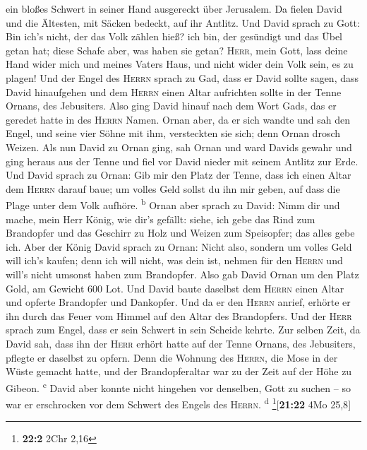 ein bloßes Schwert in seiner Hand ausgereckt über Jerusalem. Da fielen
David und die Ältesten, mit Säcken bedeckt, auf ihr Antlitz.
 Und David sprach zu Gott: Bin ich's nicht, der das Volk
zählen hieß? ich bin, der gesündigt und das Übel getan hat; diese Schafe
aber, was haben sie getan? \textsc{Herr}, mein Gott, lass deine Hand
wider mich und meines Vaters Haus, und nicht wider dein Volk sein, es zu
plagen!  Und der Engel des \textsc{Herrn} sprach zu Gad,
dass er David sollte sagen, dass David hinaufgehen und dem
\textsc{Herrn} einen Altar aufrichten sollte in der Tenne Ornans, des
Jebusiters.  Also ging David hinauf nach dem Wort Gads,
das er geredet hatte in des \textsc{Herrn} Namen.  Ornan
aber, da er sich wandte und sah den Engel, und seine vier Söhne mit ihm,
versteckten sie sich; denn Ornan drosch Weizen.  Als nun
David zu Ornan ging, sah Ornan und ward Davids gewahr und ging heraus
aus der Tenne und fiel vor David nieder mit seinem Antlitz zur Erde.
 Und David sprach zu Ornan: Gib mir den Platz der Tenne,
dass ich einen Altar dem \textsc{Herrn} darauf baue; um volles Geld
sollst du ihn mir geben, auf dass die Plage unter dem Volk aufhöre.
\textsuperscript{b}  Ornan aber sprach zu David: Nimm dir
und mache, mein Herr König, wie dir's gefällt: siehe, ich gebe das Rind
zum Brandopfer und das Geschirr zu Holz und Weizen zum Speisopfer; das
alles gebe ich.  Aber der König David sprach zu Ornan:
Nicht also, sondern um volles Geld will ich's kaufen; denn ich will
nicht, was dein ist, nehmen für den \textsc{Herrn} und will's nicht
umsonst haben zum Brandopfer.  Also gab David Ornan um
den Platz Gold, am Gewicht 600 Lot.  Und David baute
daselbst dem \textsc{Herrn} einen Altar und opferte Brandopfer und
Dankopfer. Und da er den \textsc{Herrn} anrief, erhörte er ihn durch das
Feuer vom Himmel auf den Altar des Brandopfers.  Und der
\textsc{Herr} sprach zum Engel, dass er sein Schwert in sein Scheide
kehrte.  Zur selben Zeit, da David sah, dass ihn der
\textsc{Herr} erhört hatte auf der Tenne Ornans, des Jebusiters, pflegte
er daselbst zu opfern.  Denn die Wohnung des
\textsc{Herrn}, die Mose in der Wüste gemacht hatte, und der
Brandopferaltar war zu der Zeit auf der Höhe zu Gibeon.
\textsuperscript{c}  David aber konnte nicht hingehen vor
denselben, Gott zu suchen -- so war er erschrocken vor dem Schwert des
Engels des \textsc{Herrn}. \textsuperscript{d}
\footnote{\textbf{22:2} 2Chr 2,16}{[}\textbf{21:22} 4Mo 25,8{]}

